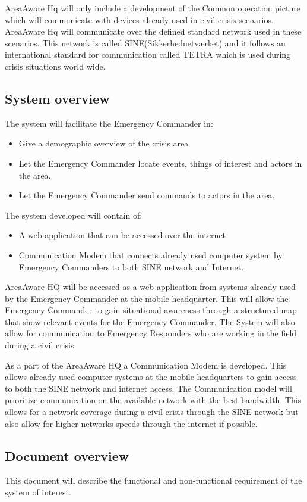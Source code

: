 AreaAware Hq will only include a development of the Common operation picture which will communicate with devices already used in civil crisis scenarios. AreaAware Hq will communicate over the defined standard network used in these scenarios. This network is called SINE(Sikkerhednetværket) and it follows an international standard for communication called TETRA which is used during crisis situations world wide. 

\subsection{System overview}
The system will facilitate the Emergency Commander in:
\begin{itemize}
	\item Give a demographic overview of the crisis area
	\item Let the Emergency Commander locate events, things of interest and actors in the area.
	\item Let the Emergency Commander send commands to actors in the area.
\end{itemize}

The system developed will contain of:
\begin{itemize}
	\item A web application that can be accessed over the internet
	\item Communication Modem that connects already used computer system by Emergency Commanders to both SINE network and Internet.
\end{itemize}

AreaAware HQ will be accessed as a web application from systems already used by the Emergency Commander at the mobile headquarter. This will allow the Emergency Commander to gain situational awareness through a structured map that show relevant events for the Emergency Commander. The System will also allow for communication to Emergency Responders who are working in the field during a civil crisis.

As a part of the AreaAware HQ a Communication Modem is developed. This allows already used computer systems at the mobile headquarters to gain access to both the SINE network and internet access. The Communication model will prioritize communication on the available network with the best bandwidth. This allows for a network coverage during a civil crisis through the SINE network but also allow for higher networks speeds through the internet if possible.

\subsection{Document overview}
\label{sec_documentOverview}
This document will describe the functional and non-functional requirement of the system of interest. 

